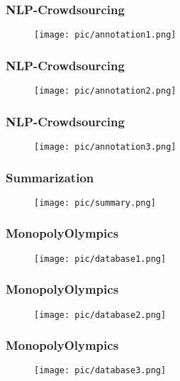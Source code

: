 \documentclass{beamer}
\begin{document}
\begin{frame}
\frametitle{NLP-Crowdsourcing}
\begin{figure}
\texttt{[image: pic/annotation1.png]}
\end{figure}
\end{frame}
\begin{frame}
\frametitle{NLP-Crowdsourcing}
\begin{figure}
\texttt{[image: pic/annotation2.png]}
\end{figure}
\end{frame}
\begin{frame}
\frametitle{NLP-Crowdsourcing}
\begin{figure}
\texttt{[image: pic/annotation3.png]}
\end{figure}
\end{frame}


\begin{frame}
\frametitle{Summarization}
\begin{figure}
\texttt{[image: pic/summary.png]}
\end{figure}
\end{frame}


\begin{frame}
\frametitle{MonopolyOlympics}
\begin{figure}
\texttt{[image: pic/database1.png]}
\end{figure}
\end{frame}
\begin{frame}
\frametitle{MonopolyOlympics}
\begin{figure}
\texttt{[image: pic/database2.png]}
\end{figure}
\end{frame}
\begin{frame}
\frametitle{MonopolyOlympics}
\begin{figure}
\texttt{[image: pic/database3.png]}
\end{figure}
\end{frame}
\end{document}
